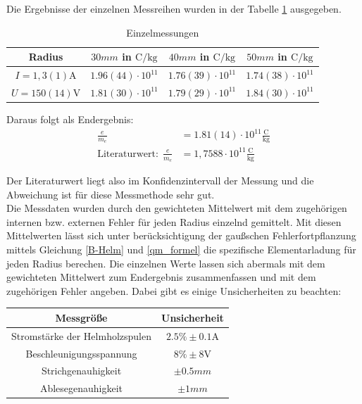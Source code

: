 \documentclass[11pt, a4paper]{article}
\begin{document}
        Die Ergebnisse der einzelnen Messreihen wurden in der Tabelle \ref{tab:einzelmessungen} ausgegeben.
        \begin{table}[H]
            \centering

            \begin{tabular}{c | c | c | c}
                Radius &  $30 \si{mm}$ in $\si{\coulomb\per\kilogram}$ & $40 \si{mm}$ in $\si{\coulomb\per\kilogram}$& $50 \si{mm}$ in $\si{\coulomb\per\kilogram}$ \\ \hline
                $I = 1,3(1) \si{\ampere}$  & $1.96(44) \cdot 10^{11}$ & $1.76(39) \cdot 10^{11}$ &$1.74(38) \cdot 10^{11}$ \\
                $U = 150(14) \si{\volt}$ & $1.81(30) \cdot 10^{11}$ & $1.79(29) \cdot 10^{11}$ &$1.84(30) \cdot 10^{11}$ \\
            \end{tabular}
            \label{tab:einzelmessungen}
            \caption{Einzelmessungen}
        \end{table}
        
        Daraus folgt als Endergebnis: 
        \begin{align}
            \frac{e}{m_e} &= 1.81(14) \cdot 10^{11} \frac{\si{\coulomb}}{\si{\kilogram}} \label{emend} \\
            \text{Literaturwert:} \ \ \frac{e}{m_e} &= 1,7588 \cdot 10^{11} \frac{\si{\coulomb}}{\si{\kilogram}}
        \end{align}

        Der Literaturwert liegt also im Konfidenzintervall der Messung und die Abweichung ist für diese Messmethode sehr gut. \\
        Die Messdaten wurden durch den gewichteten Mittelwert \cite[Kapitel 5]{ABW} mit dem zugehörigen internen bzw. externen Fehler für jeden Radius einzelnd gemittelt.
        Mit diesen Mittelwerten lässt sich unter berücksichtigung der gaußschen Fehlerfortpflanzung \cite[(19)]{ABW} mittels Gleichung \ref{B-Helm} und \ref{qm_formel} die spezifische Elementarladung für jeden Radius berechen. Die einzelnen Werte lassen sich abermals mit dem gewichteten Mittelwert zum Endergebnis zusammenfassen und mit dem zugehörigen Fehler angeben.
        Dabei gibt es einige Unsicherheiten zu beachten:
        \begin{table}[H]
            \centering
          

            \begin{tabular}{c | c}
                Messgröße & Unsicherheit \\ \hline
                Stromstärke der Helmholzspulen  & $2.5 \% \pm 0.1 \si{\ampere}$ \cite{vc130} \\
                Beschleunigungsspannung & $ 8\% \pm 8 \si{\volt}$ \cite{vc120}\\
                Strichgenauhigkeit & $\pm 0.5 \si{mm}$ \\
                Ablesegenauhigkeit & $\pm 1 \si{mm}$\\
            \end{tabular}
        \end{table}
        
\end{document}
